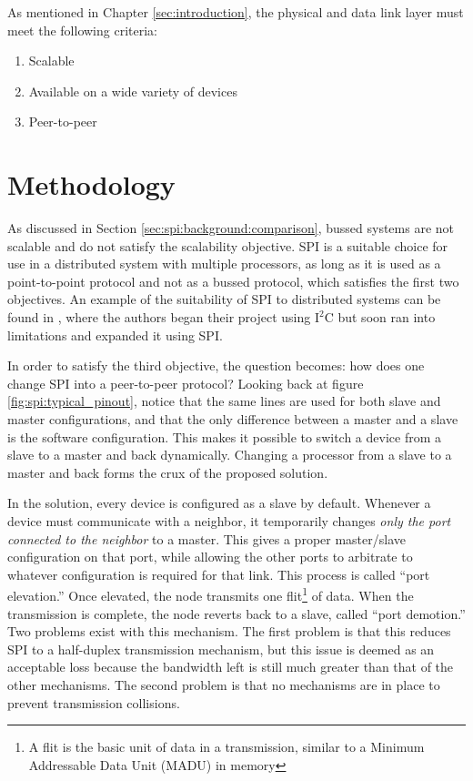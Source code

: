 As mentioned in Chapter \ref{sec:introduction}, the physical and data link layer must meet the following criteria: 
\begin{enumerate}
	\item Scalable
	\item Available on a wide variety of devices
	\item Peer-to-peer
\end{enumerate}

\section{Methodology}\label{sec:spi:methodology}

As discussed in Section \ref{sec:spi:background:comparison}, bussed systems are not scalable and do not satisfy the scalability objective. SPI is a suitable choice for use in a distributed system with multiple processors, as long as it is used as a point-to-point protocol and not as a bussed protocol, which satisfies the first two objectives. An example of the suitability of SPI to distributed systems can be found in \cite{ref:2007-szekacs-multiprocessor_spi_system}, where the authors began their project using $\textrm{I}^2 \textrm{C}$  but soon ran into limitations and expanded it using SPI.

In order to satisfy the third objective, the question becomes: how does one change SPI into a peer-to-peer protocol? Looking back at figure \ref{fig:spi:typical_pinout}, notice that the same lines are used for both slave and master configurations, and that the only difference between a master and a slave is the software configuration. This makes it possible to switch a device from a slave to a master and back dynamically. Changing a processor from a slave to a master and back forms the crux of the proposed solution.

In the solution, every device is configured as a slave by default. Whenever a device must communicate with a neighbor, it temporarily changes \emph{only the port connected to the neighbor} to a master. This gives a proper master/slave configuration on that port, while allowing the other ports to arbitrate to whatever configuration is required for that link. This process is called ``port elevation.'' Once elevated, the node transmits one flit\footnote{A flit is the basic unit of data in a transmission, similar to a Minimum Addressable Data Unit (MADU) in memory} of data. When the transmission is complete, the node reverts back to a slave, called ``port demotion.'' Two problems exist with this mechanism. The first problem is that this reduces SPI to a half-duplex transmission mechanism, but this issue is deemed as an acceptable loss because the bandwidth left is still much greater than that of the other mechanisms. The second problem is that no mechanisms are in place to prevent transmission collisions.

